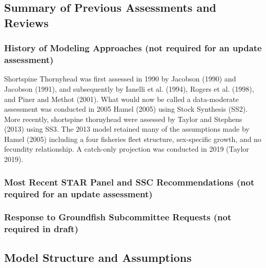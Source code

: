 \documentclass[11pt,
  english,
  letterpaper,
]{article}
\begin{document}
\hypertarget{summary-of-previous-assessments-and-reviews}{%
\subsection{Summary of Previous Assessments and Reviews}\label{summary-of-previous-assessments-and-reviews}}

\hypertarget{history-of-modeling-approaches-not-required-for-an-update-assessment}{%
\subsubsection{History of Modeling Approaches (not required for an update assessment)}\label{history-of-modeling-approaches-not-required-for-an-update-assessment}}

Shortspine Thornyhead was first assessed in 1990 by Jacobson (1990) and Jacobson (1991), and subsequently by Ianelli et al. (1994), Rogers et al. (1998), and Piner and Methot (2001). What would now be called a data-moderate assessment was conducted in 2005 Hamel (2005) using Stock Synthesis (SS2). More recently, shortspine thornyhead were assessed by Taylor and Stephens (2013) using SS3. The 2013 model retained many of the assumptions made by Hamel (2005) including a four fisheries fleet structure, sex-specific growth, and no fecundity relationship. A catch-only projection was conducted in 2019 (Taylor 2019).

\hypertarget{most-recent-star-panel-and-ssc-recommendations-not-required-for-an-update-assessment}{%
\subsubsection{Most Recent STAR Panel and SSC Recommendations (not required for an update assessment)}\label{most-recent-star-panel-and-ssc-recommendations-not-required-for-an-update-assessment}}

\hypertarget{response-to-groundfish-subcommittee-requests-not-required-in-draft}{%
\subsubsection{Response to Groundfish Subcommittee Requests (not required in draft)}\label{response-to-groundfish-subcommittee-requests-not-required-in-draft}}

\hypertarget{model-structure-and-assumptions}{%
\subsection{Model Structure and Assumptions}\label{model-structure-and-assumptions}}
\end{document}
